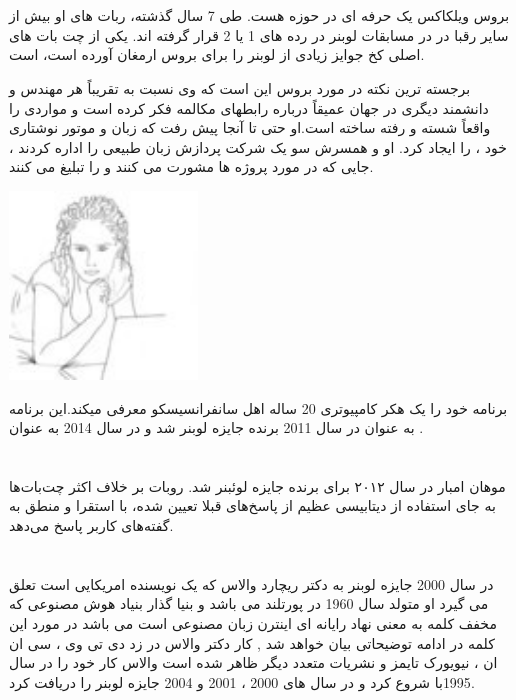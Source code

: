 \documentclass[18pt,a4paper]{report}
\begin{document}
 \section{}
 بروس ویلکاکس یک حرفه ای در حوزه  هست. طی 7 سال گذشته، ربات های او بیش از سایر رقبا در در مسابقات لوبنر در رده های 1 یا 2 قرار گرفته اند. یکی از چت بات های اصلی کخ جوایز زیادی از لوبنر را برای بروس ارمغان آورده است،  است.
 
 برجسته ترین نکته در مورد بروس این است که وی نسبت به تقریباً هر مهندس و دانشمند دیگری در جهان عمیقاً درباره رابطهای مکالمه فکر کرده است و مواردی را واقعاً شسته و رفته ساخته است.او حتی تا آنجا پیش رفت که زبان و موتور نوشتاری خود ،  را ایجاد کرد. او و همسرش سو یک شرکت پردازش زبان طبیعی  را اداره کردند ، جایی که در مورد پروژه ها مشورت می کنند و  را تبلیغ می کنند. 

 	\begin{center}
 		\includegraphics[width=5cm, height=5cm]{imgs/chatbot_rosette_d____10513.jpg}
 		\label{Rose image}

 	\end{center}

 
 برنامه  خود را یک هکر کامپیوتری 20 ساله اهل سانفرانسیسکو معرفی میکند.این برنامه به عنوان   در سال 2011 برنده جایزه لوبنر شد و در سال 2014 به عنوان  .
 
  
 \section{}
 موهان امبار در سال ۲۰۱۲ برای  برنده جایزه لوئبنر شد.
 روبات  بر خلاف اکثر چت‌بات‌ها به جای استفاده از دیتابیسی عظیم از پاسخ‌های قبلا تعیین شده، با استقرا و منطق به گفته‌های کاربر پاسخ می‌دهد.

\section{}
در سال 2000 جایزه لوبنر به دکتر ریچارد والاس که یک نویسنده امریکایی است تعلق می گیرد او متولد سال 1960 در پورتلند می باشد و بنیا گذار بنیاد هوش مصنوعی که مخفف کلمه به معنی نهاد رایانه ای اینترن زبان مصنوعی است می باشد در مورد این کلمه در ادامه توضیحاتی بیان خواهد شد , کار دکتر والاس در زد دی تی وی ، سی ان ان ، نیویورک تایمز و نشریات متعدد دیگر ظاهر شده است والاس کار خود را در سال 1995با   شروع کرد و در سال های 2000 ، 2001 و 2004 جایزه لوبنر را دریافت کرد.  
\end{document}
